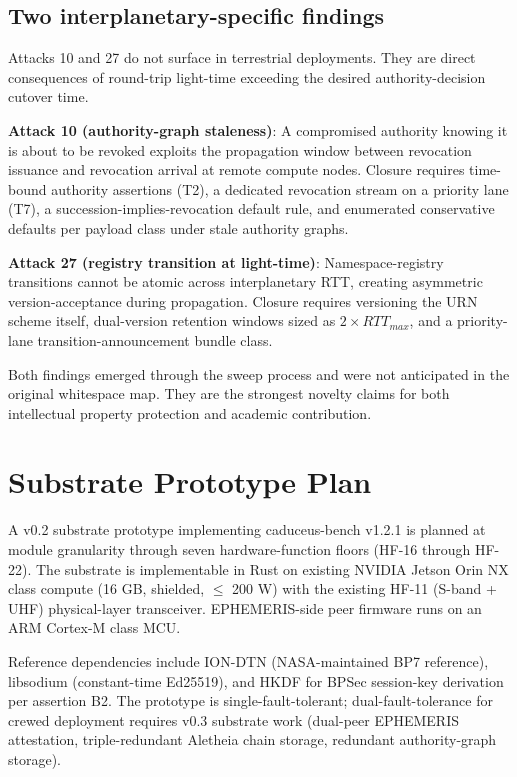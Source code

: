 \documentclass[conference]{IEEEtran}
\begin{document}
\subsection{Two interplanetary-specific findings}

Attacks 10 and 27 do not surface in terrestrial deployments. They are direct consequences of round-trip light-time exceeding the desired authority-decision cutover time.

\textbf{Attack 10 (authority-graph staleness)}: A compromised authority knowing it is about to be revoked exploits the propagation window between revocation issuance and revocation arrival at remote compute nodes. Closure requires time-bound authority assertions (T2), a dedicated revocation stream on a priority lane (T7), a succession-implies-revocation default rule, and enumerated conservative defaults per payload class under stale authority graphs.

\textbf{Attack 27 (registry transition at light-time)}: Namespace-registry transitions cannot be atomic across interplanetary RTT, creating asymmetric version-acceptance during propagation. Closure requires versioning the URN scheme itself, dual-version retention windows sized as $2 \times RTT_{max}$, and a priority-lane transition-announcement bundle class.

Both findings emerged through the sweep process and were not anticipated in the original whitespace map. They are the strongest novelty claims for both intellectual property protection and academic contribution.

\section{Substrate Prototype Plan}\label{sec:substrate}

A v0.2 substrate prototype implementing caduceus-bench v1.2.1 is planned at module granularity through seven hardware-function floors (HF-16 through HF-22). The substrate is implementable in Rust on existing NVIDIA Jetson Orin NX class compute (16 GB, shielded, $\leq$ 200 W) with the existing HF-11 (S-band + UHF) physical-layer transceiver. EPHEMERIS-side peer firmware runs on an ARM Cortex-M class MCU.

Reference dependencies include ION-DTN (NASA-maintained BP7 reference), libsodium (constant-time Ed25519), and HKDF \cite{rfc5869} for BPSec session-key derivation per assertion B2. The prototype is single-fault-tolerant; dual-fault-tolerance for crewed deployment requires v0.3 substrate work (dual-peer EPHEMERIS attestation, triple-redundant Aletheia chain storage, redundant authority-graph storage).
\end{document}
